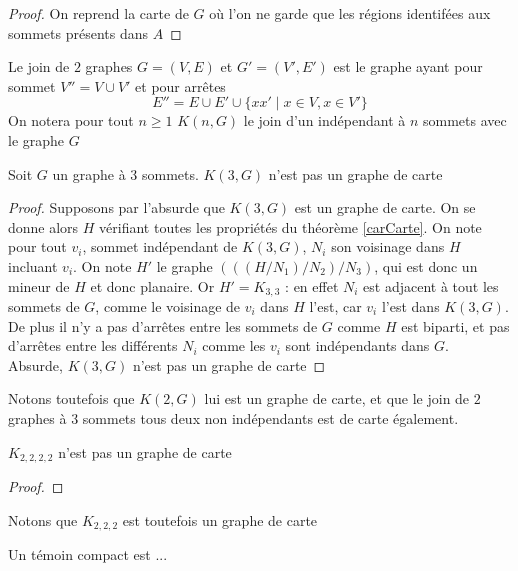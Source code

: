 \documentclass{scrartcl}
\begin{document}
\begin{flushleft}
\begin{proof}
    On reprend la carte de $G$ où l'on ne garde que les régions identifées aux sommets présents dans $A$
\end{proof}

\begin{def*}[Join]
    Le join de $2$ graphes $G = (V, E)$ et $G' = (V', E')$ est le graphe ayant pour sommet $V'' = V \cup V'$ et pour arrêtes
    \[ E'' = E \cup E' \cup \{ xx' \mid x \in V, x \in V' \} \]
    On notera pour tout $n \geq 1$ $K(n, G)$ le join d'un indépendant à $n$ sommets avec le graphe $G$
\end{def*}

\begin{prop}
    Soit $G$ un graphe à $3$ sommets. $K(3, G)$ n'est pas un graphe de carte
\end{prop}

\begin{proof}
    Supposons par l'absurde que $K(3, G)$ est un graphe de carte. On se donne alors $H$ vérifiant toutes les propriétés
    du théorème \ref{carCarte}. On note pour tout $v_i$, sommet indépendant de $K(3, G)$, $N_i$ son voisinage dans $H$
    incluant $v_i$. On note $H'$ le graphe $(((H / N_1) / N_2) / N_3)$, qui est donc un mineur de $H$ et donc planaire.
    Or $H' = K_{3,3}$ : en effet $N_i$ est adjacent à tout les sommets de $G$, comme le voisinage de $v_i$ dans $H$ l'est,
    car $v_i$ l'est dans $K(3, G)$. De plus il n'y a pas d'arrêtes entre les sommets de $G$ comme $H$ est biparti, et pas
    d'arrêtes entre les différents $N_i$ comme les $v_i$ sont indépendants dans $G$.\\
    Absurde, $K(3, G)$ n'est pas un graphe de carte
\end{proof}

Notons toutefois que $K(2, G)$ lui est un graphe de carte, et que le join de $2$ graphes à $3$ sommets tous deux non indépendants
est de carte également.

\begin{prop}
    $K_{2,2,2,2}$ n'est pas un graphe de carte
\end{prop}

\begin{proof}
    
\end{proof}

Notons que $K_{2,2,2}$ est toutefois un graphe de carte

\begin{def*}
    Un témoin compact est ...
\end{def*}


\end{flushleft}
\end{document}
